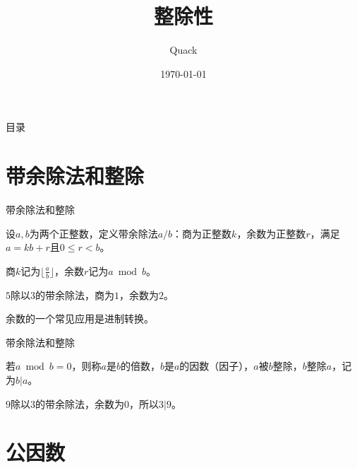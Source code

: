 \documentclass{ctexbeamer}        %
\begin{document}
%
\title{整除性}
\author{Quack}
\date{\today}
\frame{\titlepage}

%
\begin{frame}{目录}         %
  \tableofcontents[hideallsubsections]
\end{frame}

%
\section{带余除法和整除}    %


\begin{frame}{带余除法和整除}

\begin{definition}[带余除法]
    设$a,b$为两个正整数，定义带余除法$a / b$：商为正整数$k$，余数为正整数$r$，满足$a=kb+r$且$0 \le r < b$。

    商$k$记为$\lfloor \frac{a}{b} \rfloor$，余数$r$记为$a \bmod b$。
\end{definition}

\begin{example}
    $5$除以$3$的带余除法，商为$1$，余数为$2$。

    余数的一个常见应用是进制转换。
\end{example}

\end{frame}

\begin{frame}{带余除法和整除}

\begin{definition}[整除]
    若$a \bmod b = 0$，则称$a$是$b$的倍数，$b$是$a$的因数（因子），$a$被$b$整除，$b$整除$a$，记为$b|a$。
\end{definition}

\begin{example}
    $9$除以$3$的带余除法，余数为$0$，所以$3|9$。
\end{example}

\end{frame}

\section{公因数}
\end{document}
